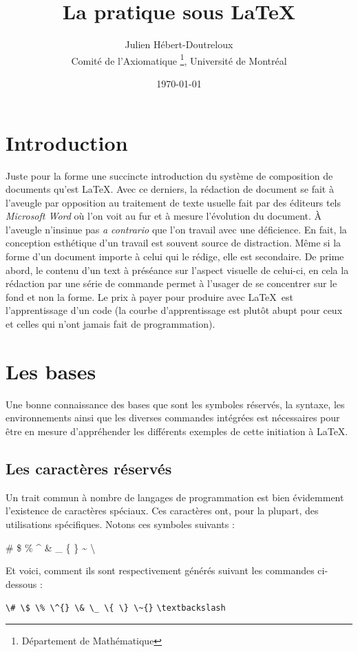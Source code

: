 \documentclass[french, babel,twocolumn]{article}
\title{La pratique sous \LaTeX}
\author{Julien Hébert-Doutreloux\\%
	Comité de l'Axiomatique%
	\thanks{Département de Mathématique}, Université de Montréal}
\date{\today}
\begin{document}
	\onecolumn
	\maketitle
	\tableofcontents
	\section{Introduction}
		Juste pour la forme une succincte introduction du système de composition de documents qu'est \LaTeX. Avec ce derniers, la rédaction de document se fait à l'aveugle par opposition au traitement de texte usuelle fait par des éditeurs tels \textit{Microsoft Word} où l'on voit au fur et à mesure l'évolution du document. À l'aveugle n'insinue pas \textit{a contrario} que l'on travail avec une déficience. En fait, la conception esthétique d'un travail est souvent source de distraction. Même si la forme d'un document importe à celui qui le rédige, elle est secondaire. De prime abord, le contenu d'un text à préséance sur l'aspect visuelle de celui-ci, en cela la rédaction par une série de commande permet à l'usager de se concentrer sur le fond et non la forme. Le prix à payer pour produire avec \LaTeX~est l'apprentissage d'un code (la courbe d'apprentissage est plutôt abupt pour ceux et celles qui n'ont jamais fait de programmation).
	\twocolumn
	\section{Les bases}
	Une bonne connaissance des bases que sont les symboles réservés, la syntaxe, les environnements ainsi que les diverses commandes intégrées est nécessaires pour être en mesure d'appréhender les différents exemples de cette initiation à \LaTeX.
%	
	\subsection{Les caractères réservés}
	Un trait commun à nombre de langages de programmation est bien évidemment l'existence de caractères spéciaux. Ces caractères ont, pour la plupart, des utilisations spécifiques. Notons ces symboles suivants :
%	
	\begin{center}
		\# \$ \% \^{} \& \_ \{ \} \~{}  \textbackslash
	\end{center}
%
	\par Et voici, comment ils sont respectivement générés suivant les commandes ci-dessous :
	\begin{flushleft}\label{lst:Caratères réservés}
		\verb|\# \$ \% \^{} \& \_ \{ \} \~{}|
		\verb|\textbackslash|
	\end{flushleft}
%	
\end{document}

